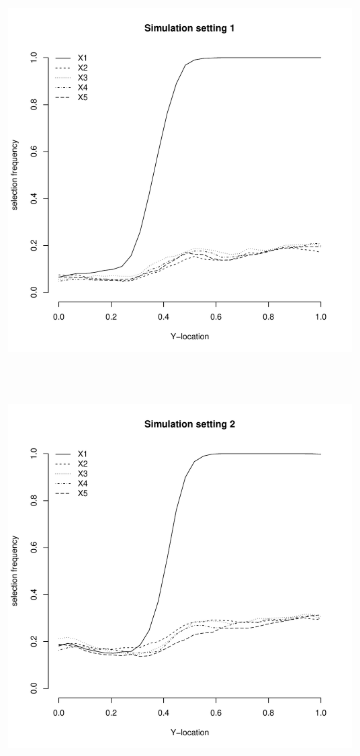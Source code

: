 \documentclass[authoryear, review, 11pt]{elsarticle}
\begin{document}
	\begin{figure}
		\centering
		\begin{subfigure}[b]{0.3\textwidth}
			\centering
			\includegraphics[width=\textwidth]{../../figures/simulation/28-1-profile-selection.pdf}
			\label{fig:gull}
		\end{subfigure}%
        ~ %
		\begin{subfigure}[b]{0.3\textwidth}
			\centering
			\includegraphics[width=\textwidth]{../../figures/simulation/28-2-profile-selection.pdf}

\end{subfigure}
\end{figure}
\end{document}
